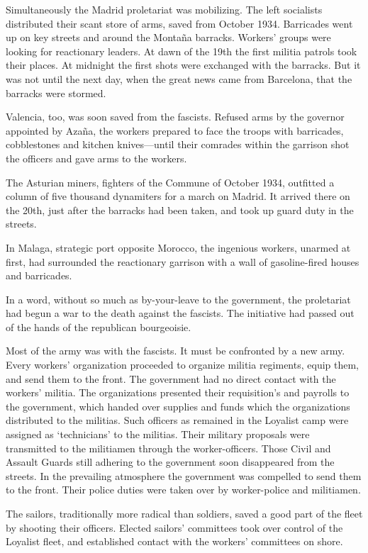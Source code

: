 Simultaneously the Madrid proletariat was mobilizing. The left socialists distributed their scant store of arms, saved from October 1934. Barricades went up on key streets and around the Montaña barracks. Workers’ groups were looking for reactionary leaders. At dawn of the 19th the first militia patrols took their places. At midnight the first shots were exchanged with the barracks. But it was not until the next day, when the great news came from Barcelona, that the barracks were stormed.

Valencia, too, was soon saved from the fascists. Refused arms by the governor appointed by Azaña, the workers prepared to face the troops with barricades, cobblestones and kitchen knives---until their comrades within the garrison shot the officers and gave arms to the workers.

The Asturian miners, fighters of the Commune of October 1934, outfitted a column of five thousand dynamiters for a march on Madrid. It arrived there on the 20th, just after the barracks had been taken, and took up guard duty in the streets.

In Malaga, strategic port opposite Morocco, the ingenious workers, unarmed at first, had surrounded the reactionary garrison with a wall of gasoline-fired houses and barricades.

In a word, without so much as by-your-leave to the government, the proletariat had begun a war to the death against the fascists. The initiative had passed out of the hands of the republican bourgeoisie.

Most of the army was with the fascists. It must be confronted by a new army. Every workers’ organization proceeded to organize militia regiments, equip them, and send them to the front. The government had no direct contact with the workers’ militia. The organizations presented their requisition’s and payrolls to the government, which handed over supplies and funds which the organizations distributed to the militias. Such officers as remained in the Loyalist camp were assigned as `technicians' to the militias. Their military proposals were transmitted to the militiamen through the worker-officers. Those Civil and Assault Guards still adhering to the government soon disappeared from the streets. In the prevailing atmosphere the government was compelled to send them to the front. Their police duties were taken over by worker-police and militiamen.

The sailors, traditionally more radical than soldiers, saved a good part of the fleet by shooting their officers. Elected sailors’ committees took over control of the Loyalist fleet, and established contact with the workers’ committees on shore.

